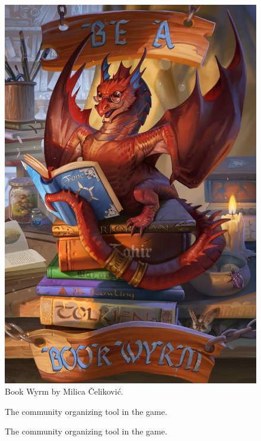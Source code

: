 \begin{figure}[h!]
    \centering
    \includegraphics[width=0.35\linewidth]{images/characters-dragon.jpg}
    \caption{Book Wyrm by Milica \v{C}elikovi\'{c}.\nocite{celikovic_book_2019}}
\end{figure}

\pagebreak

\begin{figure}[h!]
    \centering
    \caption{The community organizing tool in the game.}
\end{figure}

\begin{figure}[h!]
    \centering
    \caption{The community organizing tool in the game.}
\end{figure}

